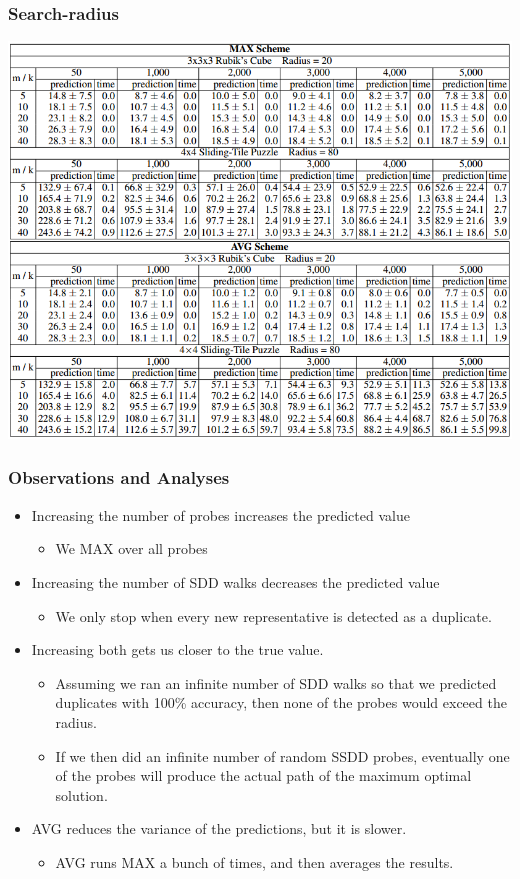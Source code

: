 \documentclass{beamer}
\begin{document}
\begin{frame}
  \frametitle{Search-radius}
  \includegraphics[scale=0.5]{lelis_fig3.png}
\end{frame}

\begin{frame}
  \frametitle{Observations and Analyses}
  \begin{itemize}
  \item Increasing the number of probes increases the predicted value
    \begin{itemize}
    \item We MAX over all probes
    \end{itemize}
  \item Increasing the number of SDD walks decreases the predicted value
    \begin{itemize}
    \item We only stop when every new representative is detected as a duplicate.
    \end{itemize}
  \item Increasing both gets us closer to the true value.
    \begin{itemize}
    \item Assuming we ran an infinite number of SDD walks so that we predicted duplicates with 100\% accuracy, then none of the probes would exceed the radius.
    \item
      If we then did an infinite number of random SSDD probes,
      eventually one of the probes will produce the actual path of the maximum optimal solution.
    \end{itemize}
  
  \item AVG reduces the variance of the predictions, but it is slower.
    \begin{itemize}
    \item AVG runs MAX a bunch of times, and then averages the results.
    \end{itemize}
    
  \end{itemize}
\end{frame}
\end{document}
